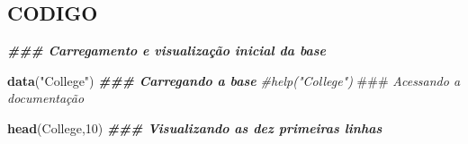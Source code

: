 \documentclass[
]{article}
\newenvironment{Shaded}{\begin{snugshade}}{\end{snugshade}}
\newcommand{\AlertTok}[1]{\textcolor[rgb]{0.94,0.16,0.16}{#1}}
\newcommand{\CommentTok}[1]{\textcolor[rgb]{0.56,0.35,0.01}{\textit{#1}}}
\newcommand{\DecValTok}[1]{\textcolor[rgb]{0.00,0.00,0.81}{#1}}
\newcommand{\DocumentationTok}[1]{\textcolor[rgb]{0.56,0.35,0.01}{\textbf{\textit{#1}}}}
\newcommand{\FunctionTok}[1]{\textcolor[rgb]{0.13,0.29,0.53}{\textbf{#1}}}
\newcommand{\NormalTok}[1]{#1}
\newcommand{\StringTok}[1]{\textcolor[rgb]{0.31,0.60,0.02}{#1}}
\begin{document}
\subsection{CODIGO}\label{codigo}

\begin{Shaded}
\begin{Highlighting}[]
\DocumentationTok{\#\#\# Carregamento e visualização inicial da base}

\FunctionTok{data}\NormalTok{(}\StringTok{"College"}\NormalTok{) }\DocumentationTok{\#\#\# Carregando a base}
\CommentTok{\#help("College") }\AlertTok{\#\#\#}\CommentTok{ Acessando a documentação}

\FunctionTok{head}\NormalTok{(College,}\DecValTok{10}\NormalTok{) }\DocumentationTok{\#\#\# Visualizando as dez primeiras linhas}
\end{Highlighting}
\end{Shaded}
\end{document}
